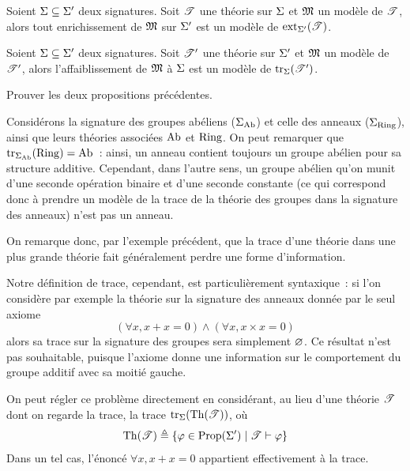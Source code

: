 \begin{proposition}
  Soient $\Sigma\subseteq \Sigma'$ deux signatures. Soit $\mathscr T$ une théorie sur
  $\Sigma$ et $\mathfrak{M}$ un modèle de $\mathscr T$, alors tout enrichissement de
  $\mathfrak{M}$ sur $\Sigma'$ est un modèle de $\operatorname{ext}_{\Sigma'}(\mathscr T)$.
\end{proposition}

\begin{proposition}\label{prop.ext.trace2}
  Soient $\Sigma\subseteq \Sigma'$ deux signatures. Soit $\mathscr T'$ une théorie sur
  $\Sigma'$ et $\mathfrak{M}$ un modèle de $\mathscr T'$, alors l'affaiblissement de
  $\mathfrak{M}$ à $\Sigma$ est un modèle de $\operatorname{tr}_{\Sigma}(\mathscr T')$.
\end{proposition}

\begin{exercise}
  Prouver les deux propositions précédentes.
\end{exercise}

\begin{example}
  Considérons la signature des groupes abéliens ($\Sigma_{\operatorname{Ab}}$) et celle des
  anneaux ($\Sigma_{\operatorname{Ring}}$), ainsi que leurs
  théories associées $\operatorname{Ab}$ et $\operatorname{Ring}$.
  On peut remarquer que $\operatorname{tr}_{\Sigma_{\operatorname{Ab}}}(\operatorname{Ring}) = \operatorname{Ab}$~: ainsi,
  un anneau contient toujours un groupe abélien pour sa structure additive.
  Cependant, dans l'autre sens, un groupe abélien qu'on munit d'une seconde
  opération
  binaire et d'une seconde constante (ce qui correspond donc à prendre un
  modèle de la trace de la théorie des groupes dans la
  signature des anneaux) n'est pas  un anneau.
\end{example}

On remarque donc, par l'exemple précédent, que la trace d'une théorie dans une
plus grande théorie fait généralement perdre une forme d'information.

Notre définition de trace, cependant, est particulièrement syntaxique~: si l'on
considère par exemple la théorie sur la signature des anneaux donnée par le seul
axiome
\[(\forall x, x + x = 0) \land (\forall x, x \times x = 0)\]
alors sa trace sur la signature des groupes sera simplement $\varnothing$.
Ce résultat n'est pas souhaitable, puisque l'axiome donne une information sur le
comportement du groupe additif avec sa moitié gauche.

On peut régler ce problème directement en considérant, au lieu d'une théorie
$\mathscr T$ dont on regarde la trace, la trace $\operatorname{tr}_{\Sigma}(\operatorname{Th}(\mathscr T))$, où
\[\operatorname{Th}(\mathscr T) \triangleq \left\{ \varphi \in \operatorname{Prop}(\Sigma') \;\middle\vert\; \mathscr T\vdash \varphi \right\}\]
Dans un tel cas, l'énoncé $\forall x, x + x = 0$ appartient
effectivement à la trace.

